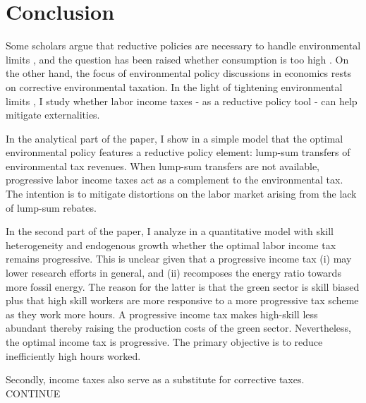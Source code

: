 \section{Conclusion}\label{sec:con}
Some scholars argue that  reductive policies are necessary to handle environmental limits \citep{Schor2005SustainableReductionb, VanVuuren2018AlternativeTechnologies, Bertram2018TargetedScenarios}, and the question has been raised whether consumption is too high \citep{Arrow2004AreMuch}. On the other hand, the focus of environmental policy discussions in economics rests on corrective environmental taxation. In the light of tightening environmental limits \citep{Rockstrom2009AHumanity, IPCC2022}, I study whether labor income taxes - as a reductive policy tool - can help mitigate externalities. 

In the analytical part of the paper, I show in a simple model that the optimal environmental policy features a reductive policy element: lump-sum transfers of environmental tax revenues. When lump-sum transfers are not available, progressive labor income taxes act as a complement to the environmental tax. The intention is to mitigate distortions on the labor market arising from the lack of lump-sum rebates. %


In the second part of the paper, I analyze in a quantitative model with skill heterogeneity and endogenous growth whether the optimal labor income tax remains progressive.
This is unclear given that a progressive income tax (i) may lower research efforts in general, and (ii) recomposes the energy ratio towards more fossil energy. The reason for the latter is that the green sector is skill biased plus that high skill workers are more responsive to a more progressive tax scheme as they work more hours. 
A progressive income tax makes high-skill less abundant thereby raising the production costs of the green sector. 
Nevertheless, the optimal income tax is progressive. The primary objective is to reduce inefficiently high hours worked. 

Secondly, income taxes also serve as a substitute for corrective taxes.
CONTINUE

